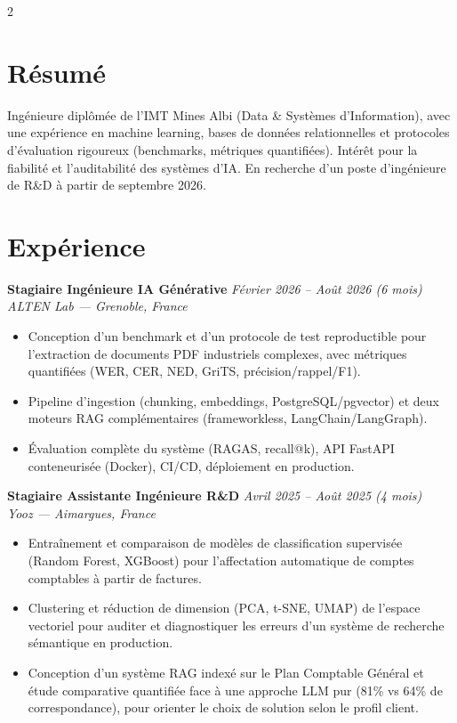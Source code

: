 \documentclass[10.5pt,a4paper]{article}
\newcommand{\sectionrule}{\vspace{-6pt}{\color{accent}\hrule height 1pt}\vspace{3pt}}
\newcommand{\cvexp}[5]{%
  \noindent\textbf{#1} \hfill {\itshape\color{graytext}\small #4}\\
  {\itshape #2 --- #3}\\[-2pt]
  #5
  \vspace{5pt}
}
\begin{document}
\setlength{\columnsep}{1.5em}
\begin{paracol}{2}

\section*{Résumé}
\sectionrule
\justifying
Ingénieure diplômée de l'IMT Mines Albi (Data \& Systèmes d'Information), avec une expérience en machine learning, bases de données relationnelles et protocoles d'évaluation rigoureux (benchmarks, métriques quantifiées). Intérêt pour la fiabilité et l'auditabilité des systèmes d'IA. En recherche d'un poste d'ingénieure de R\&D à partir de septembre 2026.

\section*{Expérience}
\sectionrule

\cvexp{Stagiaire Ingénieure IA Générative}{ALTEN Lab}{Grenoble, France}{Février 2026 -- Août 2026 (6 mois)}{%
  \begin{itemize}[leftmargin=12pt, itemsep=2pt, topsep=0pt, partopsep=0pt, parsep=0pt]
    \item Conception d'un benchmark et d'un protocole de test reproductible pour l'extraction de documents PDF industriels complexes, avec métriques quantifiées (WER, CER, NED, GriTS, précision/\allowbreak rappel/\allowbreak F1).
    \item Pipeline d'ingestion (chunking, embeddings, PostgreSQL/\allowbreak pgvector) et deux moteurs RAG complémentaires (frameworkless, LangChain/\allowbreak LangGraph).
    \item Évaluation complète du système (RAGAS, recall@k), API FastAPI conteneurisée (Docker), CI/CD, déploiement en production.
  \end{itemize}
}

\cvexp{Stagiaire Assistante Ingénieure R\&D}{Yooz}{Aimargues, France}{Avril 2025 -- Août 2025 (4 mois)}{%
  \begin{itemize}[leftmargin=12pt, itemsep=2pt, topsep=0pt, partopsep=0pt, parsep=0pt]
    \item Entraînement et comparaison de modèles de classification supervisée (Random Forest, XGBoost) pour l'affectation automatique de comptes comptables à partir de factures.
    \item Clustering et réduction de dimension (PCA, t-SNE, UMAP) de l'espace vectoriel pour auditer et diagnostiquer les erreurs d'un système de recherche sémantique en production.
    \item Conception d'un système RAG indexé sur le Plan Comptable Général et étude comparative quantifiée face à une approche LLM pur (81\% vs 64\% de correspondance), pour orienter le choix de solution selon le profil client.
  \end{itemize}
}


\end{paracol}
\end{document}
